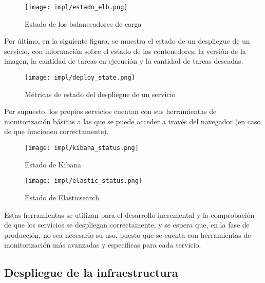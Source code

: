 \begin{figure}[H]
	\centering
	\texttt{[image: impl/estado\_elb.png]}
	\caption{Estado de los balanceadores de carga}
	\label{fig:estado_elb}
\end{figure}

Por último, en la siguiente figura, se muestra el estado de un despliegue de un
servicio, con información sobre el estado de los contenedores, la versión de la
imagen, la cantidad de tareas en ejecución y la cantidad de tareas deseadas.

\begin{figure}[H]
	\centering
	\texttt{[image: impl/deploy\_state.png]}
	\caption{Métricas de estado del despliegue de un servicio}
	\label{fig:deploy_state}
\end{figure}

Por supuesto, los propios servicios cuentan con sus herramientas de
monitorización básicas a las que se puede acceder a través del navegador (en
caso de que funcionen correctamente).

\begin{figure}[H]
	\centering
	\texttt{[image: impl/kibana\_status.png]}
	\caption{Estado de Kibana}
	\label{fig:kibana_status}
\end{figure}

\begin{figure}[H]
	\centering
	\texttt{[image: impl/elastic\_status.png]}
	\caption{Estado de Elasticsearch}
	\label{fig:elastic_status}
\end{figure}

Estas herramientas se utilizan para el desarrollo incremental y la comprobación
de que los servicios se despliegan correctamente, y se espera que, en la fase de
producción, no sea necesario su uso, puesto que se cuenta con herramientas de
monitorización más avanzadas y específicas para cada servicio.

\newpage{}
\subsection{Despliegue de la infraestructura}\label{subsec:impl_cloud_despliegue}


